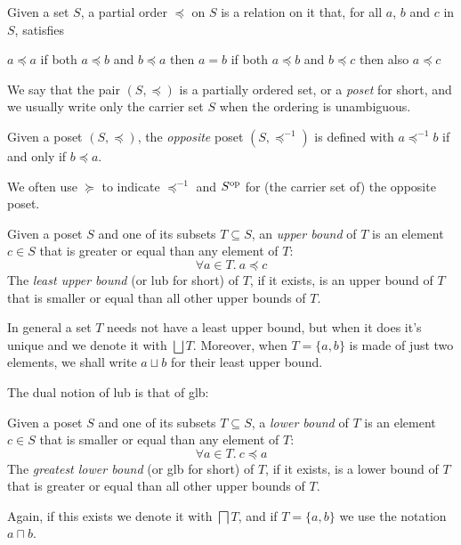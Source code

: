 \begin{definition}
	Given a set $S$, a partial order $\preceq$ on $S$ is a relation on it that, for all $a$, $b$ and $c$ in $S$, satisfies
	\begin{itemize}
		 $a \preceq a$
		 if both $a \preceq b$ and $b \preceq a$ then $a = b$
		 if both $a \preceq b$ and $b \preceq c$ then also $a \preceq c$
	\end{itemize}
\end{definition}
We say that the pair $(S, \preceq)$ is a partially ordered set, or a \textit{poset} for short, and we usually write only the carrier set $S$ when the ordering is unambiguous.

\begin{definition}
	Given a poset $(S, \preceq)$, the \textit{opposite} poset $(S, \preceq^{-1})$ is defined with $a \preceq^{-1} b$ if and only if $b \preceq a$.
\end{definition}
We often use $\succeq$ to indicate $\preceq^{-1}$ and $S^{\text{op}}$ for (the carrier set of) the opposite poset.

\begin{definition}
	Given a poset $S$ and one of its subsets $T \subseteq S$, an \textit{upper bound} of $T$ is an element $c \in S$ that is greater or equal than any element of $T$:
	\[
	\forall a \in T.\ a \preceq c
	\]
	The \textit{least upper bound} (or lub for short) of $T$, if it exists, is an upper bound of $T$ that is smaller or equal than all other upper bounds of $T$.
\end{definition}
In general a set $T$ needs not have a least upper bound, but when it does it's unique and we denote it with $\bigsqcup T$. Moreover, when $T = \{ a, b \}$ is made of just two elements, we shall write $a \sqcup b$ for their least upper bound.

The dual notion of lub is that of glb:
\begin{definition}
	Given a poset $S$ and one of its subsets $T \subseteq S$, a \textit{lower bound} of $T$ is an element $c \in S$ that is smaller or equal than any element of $T$:
	\[
	\forall a \in T.\ c \preceq a
	\]
	The \textit{greatest lower bound} (or glb for short) of $T$, if it exists, is a lower bound of $T$ that is greater or equal than all other upper bounds of $T$.
\end{definition}
Again, if this exists we denote it with $\bigsqcap T$, and if $T = \{ a, b \}$ we use the notation $a \sqcap b$.

